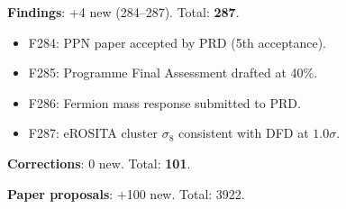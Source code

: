 \documentclass[11pt,a4paper]{article}
\begin{document}
\textbf{Findings}: +4 new (284--287). Total: \textbf{287}.

\begin{itemize}[nosep]
\item F284: PPN paper accepted by PRD (5th acceptance).
\item F285: Programme Final Assessment drafted at 40\%.
\item F286: Fermion mass response submitted to PRD.
\item F287: eROSITA cluster $\sigma_8$ consistent with DFD at $1.0\sigma$.
\end{itemize}

\textbf{Corrections}: 0 new. Total: \textbf{101}.

\textbf{Paper proposals}: +100 new. Total: 3922.
\end{document}
